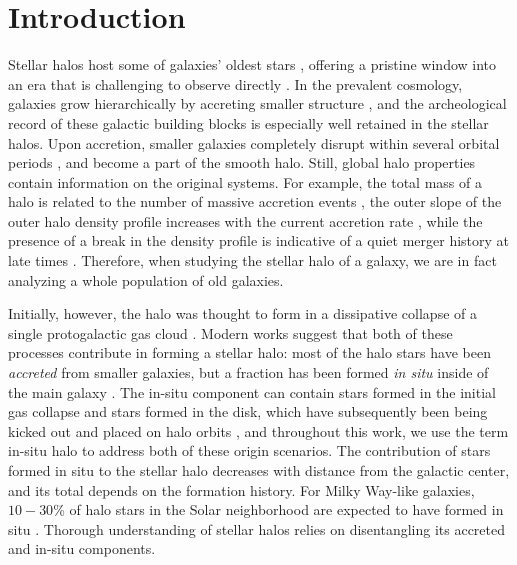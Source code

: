 \documentclass[apj, twocolappendix, numberedappendix, appendixfloats]{emulateapj}
\begin{document}
\section{Introduction}
Stellar halos host some of galaxies' oldest stars \citep{beers2005}, offering a pristine window into an era that is challenging to observe directly \citep{jwst}.
In the prevalent cosmology, galaxies grow hierarchically by accreting smaller structure \citep{white1978, diemand2007, springel2008, bolshoy}, and the archeological record of these galactic building blocks is especially well retained in the stellar halos.
Upon accretion, smaller galaxies completely disrupt within several orbital periods \citep{helmi1999b}, and become a part of the smooth halo.
Still, global halo properties contain information on the original systems.
For example, the total mass of a halo is related to the number of massive accretion events \citep{bj2005, cooper2010}, the outer slope of the outer halo density profile increases with the current accretion rate \citep{diemer2014}, while the presence of a break in the density profile is indicative of a quiet merger history at late times \citep{deason2013}.
Therefore, when studying the stellar halo of a galaxy, we are in fact analyzing a whole population of old galaxies.

Initially, however, the halo was thought to form in a dissipative collapse of a single protogalactic gas cloud \citep{els}.
Modern works suggest that both of these processes contribute in forming a stellar halo: most of the halo stars have been \emph{accreted} from smaller galaxies, but a fraction has been formed \emph{in situ} inside of the main galaxy \citep{zolotov2009, font2011}.
The in-situ component can contain stars formed in the initial gas collapse \citep{samland2003} and stars formed in the disk, which have subsequently been being kicked out and placed on halo orbits \citep{purcell2010}, and throughout this work, we use the term in-situ halo to address both of these origin scenarios.
The contribution of stars formed in situ to the stellar halo decreases with distance from the galactic center, and its total depends on the formation history.
For Milky Way-like galaxies, $10-30$\% of halo stars in the Solar neighborhood are expected to have formed in situ \citep{zolotov2009}. 
Thorough understanding of stellar halos relies on disentangling its accreted and in-situ components.
\end{document}
